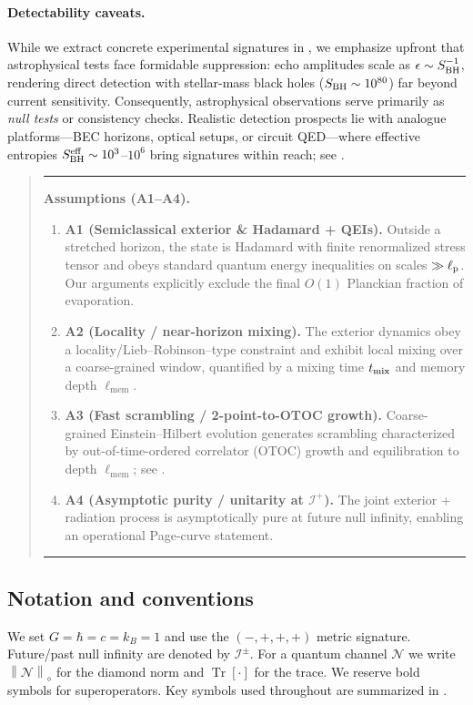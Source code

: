 \documentclass[a4paper,11pt]{article}
\newcommand{\Ddiamond}[1]{\left\|#1\right\|_\diamond}
\newenvironment{infobox}{%
  \par\smallskip\begin{quote}\noindent\hrule\smallskip
}{%
  \smallskip\hrule\end{quote}\smallskip
}
\newenvironment{boxedresult}[1]{\begin{infobox}\noindent\textbf{#1.}}{\end{infobox}}
\let\mathscr\mathcal
\newcommand{\ellmem}{\ensuremath{\ell_{\mathrm{mem}}}}
\newcommand{\Tr}{\operatorname{Tr}}
\theoremstyle{plain}
\theoremstyle{definition}
\theoremstyle{remark}
\begin{document}
\paragraph{Detectability caveats.}
While we extract concrete experimental signatures in , we emphasize upfront that astrophysical tests face formidable suppression: echo amplitudes scale as $\epsilon\sim S_{\rm BH}^{-1}$, rendering direct detection with stellar-mass black holes ($S_{\rm BH}\sim 10^{80}$) far beyond current sensitivity. Consequently, astrophysical observations serve primarily as \emph{null tests} or consistency checks. Realistic detection prospects lie with analogue platforms---BEC horizons, optical setups, or circuit QED---where effective entropies $S_{\rm BH}^{\rm eff}\sim 10^3$--$10^6$ bring signatures within reach; see .

\begin{boxedresult}{Assumptions (A1--A4)}\label{box:assumptions}
\begin{enumerate}[leftmargin=*,itemsep=0.25em]
  \item \textbf{A1 (Semiclassical exterior \& Hadamard + QEIs).} Outside a stretched horizon, the state is Hadamard with finite renormalized stress tensor and obeys standard quantum energy inequalities on scales $\gg \ell_{\rm p}$. Our arguments explicitly exclude the final $O(1)$ Planckian fraction of evaporation.
  \item \textbf{A2 (Locality / near-horizon mixing).} The exterior dynamics obey a locality/Lieb--Robinson--type constraint and exhibit local mixing over a coarse-grained window, quantified by a mixing time $t_{\rm mix}$ and memory depth $\ellmem$.
  \item \textbf{A3 (Fast scrambling / 2-point-to-OTOC growth).} Coarse-grained Einstein--Hilbert evolution generates scrambling characterized by out-of-time-ordered correlator (OTOC) growth and equilibration to depth $\ellmem$; see .
  \item \textbf{A4 (Asymptotic purity / unitarity at $\mathscr{I}^+$).} The joint exterior + radiation process is asymptotically pure at future null infinity, enabling an operational Page-curve statement.
\end{enumerate}
\end{boxedresult}

\subsection{Notation and conventions}
\label{sec:notation}
We set $G=\hbar=c=k_B=1$ and use the $(-,+,+,+)$ metric signature. Future/past null infinity are denoted by $\mathscr{I}^\pm$. For a quantum channel $\mathcal{N}$ we write $\Ddiamond{\mathcal{N}}$ for the diamond norm and $\Tr[\cdot]$ for the trace. We reserve bold symbols for superoperators. Key symbols used throughout are summarized in .
\end{document}
